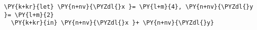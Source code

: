 \begin{Verbatim}[commandchars=\\\{\}]
\PY{k+kr}{let} \PY{n+nv}{\PYZdl{}x }= \PY{l+m}{4}, \PY{n+nv}{\PYZdl{}y }= \PY{l+m}{2}
  \PY{k+kr}{in} \PY{n+nv}{\PYZdl{}x }+ \PY{n+nv}{\PYZdl{}y}
\end{Verbatim}
